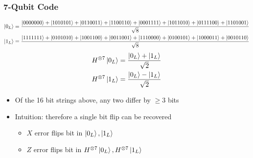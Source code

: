 \documentclass{beamer}
\begin{document}
\begin{frame}
  \frametitle{7-Qubit Code}
  \vspace{-1cm}
  {\tiny
    \begin{align*}
      \ket{0_L} &= \frac{\ket{0000000}+\ket{1010101}+\ket{0110011}+\ket{1100110}+\ket{0001111}+\ket{1011010}+\ket{0111100}+\ket{1101001}}{\sqrt{8}} \\
      \ket{1_L} &= \frac{\ket{1111111}+\ket{0101010}+\ket{1001100}+\ket{0011001}+\ket{1110000}+\ket{0100101}+\ket{1000011}+\ket{0010110}}{\sqrt{8}}
    \end{align*}
    \begin{align*}
      H^{\otimes 7}\ket{0_L} &= \frac{\ket{0_L}+\ket{1_L}}{\sqrt{2}} \\
      H^{\otimes 7}\ket{1_L} &= \frac{\ket{0_L}-\ket{1_L}}{\sqrt{2}}
    \end{align*}
  }
  \begin{itemize}
  \item Of the 16 bit strings above, any two differ by $\geq 3$ bits
  \item Intuition: therefore a single bit flip can be recovered
    \begin{itemize}
    \item $X$ error flips bit in $\ket{0_L},\ket{1_L}$
    \item $Z$ error flips bit in $H^{\otimes 7}\ket{0_L},H^{\otimes 7}\ket{1_L}$
    \end{itemize}
  \end{itemize}
\end{frame}

\end{document}
